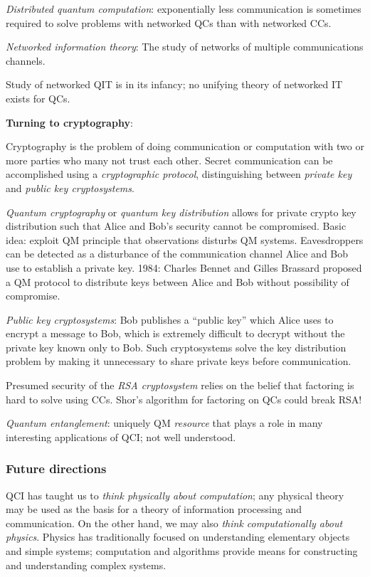 \documentclass{article}
\numberwithin{equation}{section}
\begin{document}
\textit{Distributed quantum computation}: exponentially less communication is sometimes required to solve problems with networked QCs than with networked CCs.

\textit{Networked information theory}: The study of networks of multiple communications channels.

Study of networked QIT is in its infancy; no unifying theory of networked IT exists for QCs. 

\textbf{Turning to cryptography}:

Cryptography is the problem of doing communication or computation with two or more parties who many not trust each other. Secret communication can be accomplished using a \textit{cryptographic protocol}, distinguishing between \textit{private key} and \textit{public key cryptosystems}.

\textit{Quantum cryptography} or \textit{quantum key distribution} allows for private crypto key distribution such that Alice and Bob's security cannot be compromised. Basic idea: exploit QM principle that observations disturbs QM systems. Eavesdroppers can be detected as a disturbance of the communication channel Alice and Bob use to establish a private key. 1984: Charles Bennet and Gilles Brassard proposed a QM protocol to distribute keys between Alice and Bob without possibility of compromise.

\textit{Public key cryptosystems}: Bob publishes a ``public key'' which Alice uses to encrypt a message to Bob, which is extremely difficult to decrypt without the private key known only to Bob. Such cryptosystems solve the key distribution problem by making it unnecessary to share private keys before communication.

Presumed security of the \textit{RSA cryptosystem} relies on the belief that factoring is hard to solve using CCs. Shor's algorithm for factoring on QCs could break RSA!

\textit{Quantum entanglement}: uniquely QM \textit{resource} that plays a role in many interesting applications of QCI; not well understood.

\subsubsection{Future directions}

QCI has taught us to \textit{think physically about computation}; any physical theory may be used as the basis for a theory of information processing and communication. On the other hand, we may also \textit{think computationally about physics}. Physics has traditionally focused on understanding elementary objects and simple systems; computation and algorithms provide means for constructing and understanding complex systems.
\end{document}
